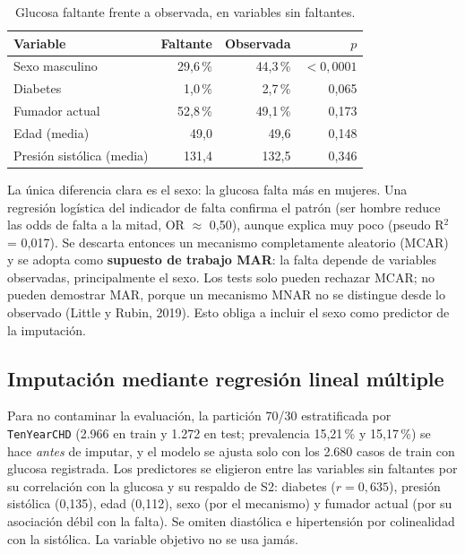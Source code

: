 \documentclass[11pt,a4paper]{article}
\begin{document}
\begin{table}[H]
\centering\small
\caption{Glucosa faltante frente a observada, en variables sin faltantes.}\label{tab:meca}
\begin{tabular}{@{}lrrr@{}}
\toprule
\textbf{Variable} & \textbf{Faltante} & \textbf{Observada} & \textbf{$p$} \\
\midrule
Sexo masculino        & 29,6\,\% & 44,3\,\% & $<0,0001$ \\
Diabetes              & 1,0\,\%  & 2,7\,\%  & 0,065 \\
Fumador actual        & 52,8\,\% & 49,1\,\% & 0,173 \\
Edad (media)          & 49,0     & 49,6     & 0,148 \\
Presión sistólica (media) & 131,4 & 132,5   & 0,346 \\
\bottomrule
\end{tabular}
\end{table}

La única diferencia clara es el sexo: la glucosa falta más en mujeres. Una regresión logística del indicador de falta confirma el patrón (ser hombre reduce las odds de falta a la mitad, OR $\approx$ 0,50), aunque explica muy poco (pseudo R$^2$ = 0,017). Se descarta entonces un mecanismo completamente aleatorio (MCAR) y se adopta como \textbf{supuesto de trabajo MAR}: la falta depende de variables observadas, principalmente el sexo. Los tests solo pueden rechazar MCAR; no pueden demostrar MAR, porque un mecanismo MNAR no se distingue desde lo observado (Little y Rubin, 2019). Esto obliga a incluir el sexo como predictor de la imputación.

\subsection{Imputación mediante regresión lineal múltiple}
Para no contaminar la evaluación, la partición 70/30 estratificada por \texttt{TenYearCHD} (2.966 en train y 1.272 en test; prevalencia 15,21\,\% y 15,17\,\%) se hace \emph{antes} de imputar, y el modelo se ajusta solo con los 2.680 casos de train con glucosa registrada. Los predictores se eligieron entre las variables sin faltantes por su correlación con la glucosa y su respaldo de S2: diabetes ($r=0,635$), presión sistólica (0,135), edad (0,112), sexo (por el mecanismo) y fumador actual (por su asociación débil con la falta). Se omiten diastólica e hipertensión por colinealidad con la sistólica. La variable objetivo no se usa jamás.
\end{document}
